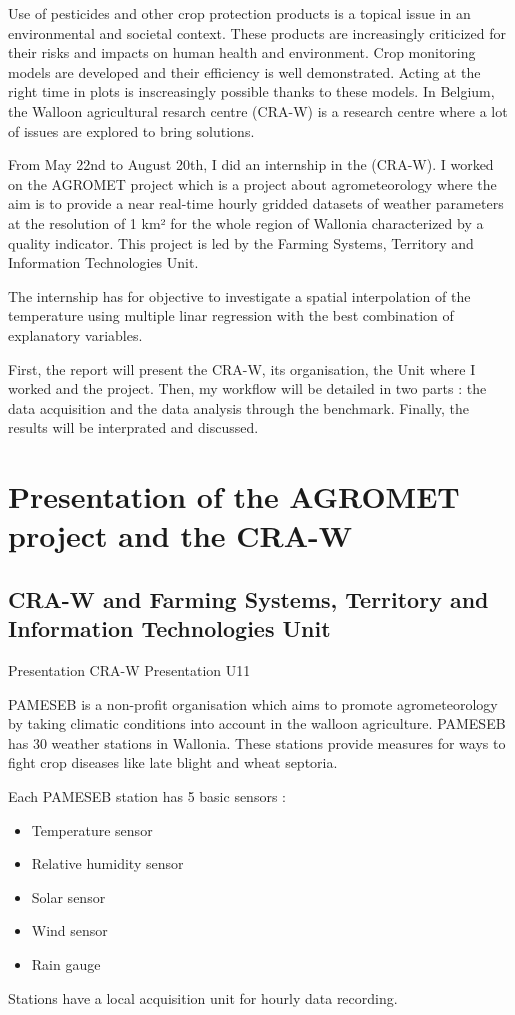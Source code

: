 \documentclass[12pt,twoside]{reedthesis}
\providecommand{\tightlist}{%
  \setlength{\itemsep}{0pt}\setlength{\parskip}{0pt}}
\theoremstyle{definition}
\theoremstyle{definition}
\theoremstyle{definition}
\theoremstyle{remark}
\begin{document}
Use of pesticides and other crop protection products is a topical issue
in an environmental and societal context. These products are
increasingly criticized for their risks and impacts on human health and
environment. Crop monitoring models are developed and their efficiency
is well demonstrated. Acting at the right time in plots is inscreasingly
possible thanks to these models. In Belgium, the Walloon agricultural
resarch centre (CRA-W) is a research centre where a lot of issues are
explored to bring solutions.

From May 22nd to August 20th, I did an internship in the (CRA-W). I
worked on the AGROMET project which is a project about agrometeorology
where the aim is to provide a near real-time hourly gridded datasets of
weather parameters at the resolution of 1 km² for the whole region of
Wallonia characterized by a quality indicator. This project is led by
the Farming Systems, Territory and Information Technologies Unit.

The internship has for objective to investigate a spatial interpolation
of the temperature using multiple linar regression with the best
combination of explanatory variables.

First, the report will present the CRA-W, its organisation, the Unit
where I worked and the project. Then, my workflow will be detailed in
two parts : the data acquisition and the data analysis through the
benchmark. Finally, the results will be interprated and discussed.

\chapter{Presentation of the AGROMET project and the
CRA-W}\label{presentation}

\section{CRA-W and Farming Systems, Territory and Information
Technologies
Unit}\label{cra-w-and-farming-systems-territory-and-information-technologies-unit}

Presentation CRA-W Presentation U11

PAMESEB is a non-profit organisation which aims to promote
agrometeorology by taking climatic conditions into account in the
walloon agriculture. PAMESEB has 30 weather stations in Wallonia. These
stations provide measures for ways to fight crop diseases like late
blight and wheat septoria.

Each PAMESEB station has 5 basic sensors :
\begin{itemize}
\tightlist
\item
  Temperature sensor
\item
  Relative humidity sensor
\item
  Solar sensor
\item
  Wind sensor
\item
  Rain gauge
\end{itemize}
Stations have a local acquisition unit for hourly data recording.
\end{document}
